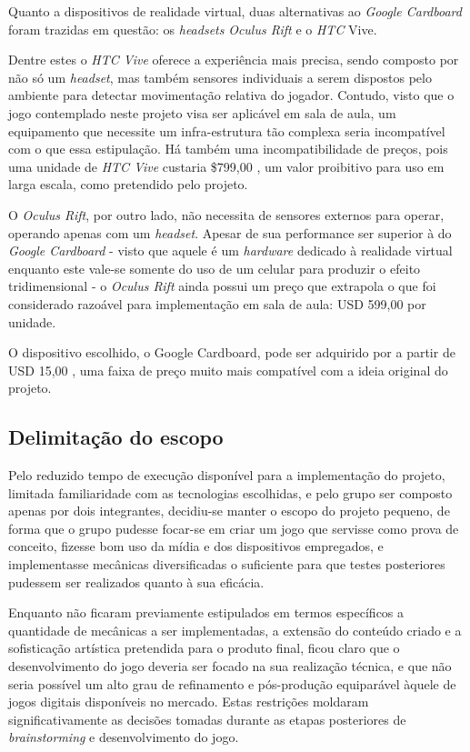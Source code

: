 Quanto a dispositivos de realidade virtual, duas alternativas ao \textit{Google Cardboard} foram trazidas em questão: os \textit{headsets} \textit{Oculus Rift} e o \textit{HTC} Vive. 

Dentre estes o \textit{HTC Vive} oferece a experiência mais precisa, sendo composto por não só um \textit{headset}, mas também sensores individuais a serem dispostos pelo ambiente para detectar movimentação relativa do jogador. Contudo, visto que o jogo contemplado neste projeto visa ser aplicável em sala de aula, um equipamento que necessite um infra-estrutura tão complexa seria incompatível com o que essa estipulação. Há também uma incompatibilidade de preços, pois uma unidade de \textit{HTC Vive} custaria \$799,00  \cite{vive:2016:store}, um valor proibitivo para uso em larga escala, como pretendido pelo projeto.

O \textit{Oculus Rift}, por outro lado, não necessita de sensores externos para operar, operando apenas com um \textit{headset}. Apesar de sua performance ser superior à do \textit{Google Cardboard} - visto que aquele é um \textit{hardware} dedicado à realidade virtual enquanto este vale-se somente do uso de um celular para produzir o efeito tridimensional - o \textit{Oculus Rift} ainda possui um preço que extrapola o que foi considerado razoável para implementação em sala de aula: USD 599,00  \cite{rift:2016:store} por unidade.

O dispositivo escolhido, o Google Cardboard, pode ser adquirido por a partir de USD 15,00  \cite{cardboard:2016:store}, uma faixa de preço muito mais compatível com a ideia original do projeto.

\subsection{Delimitação do escopo}\label{subsec-delimitacao-escopo}

Pelo reduzido tempo de execução disponível para a implementação do projeto,
limitada familiaridade com as tecnologias escolhidas, e pelo grupo ser
composto apenas por dois integrantes, decidiu-se manter o escopo do projeto
pequeno, de forma que o grupo pudesse focar-se em criar um jogo que servisse
como prova de conceito, fizesse bom uso da mídia e dos dispositivos empregados,
e implementasse mecânicas diversificadas o suficiente para que testes posteriores
pudessem ser realizados quanto à sua eficácia.

Enquanto não ficaram previamente estipulados em termos específicos a quantidade de
mecânicas a ser implementadas, a extensão do conteúdo criado e a sofisticação
artística pretendida para o produto final, ficou claro que o desenvolvimento do
jogo deveria ser focado na sua realização técnica, e que não seria possível um
alto grau de refinamento e pós-produção equiparável àquele de jogos digitais
disponíveis no mercado. Estas restrições moldaram significativamente as decisões
tomadas durante as etapas posteriores de \textit{brainstorming} e desenvolvimento do
jogo.


